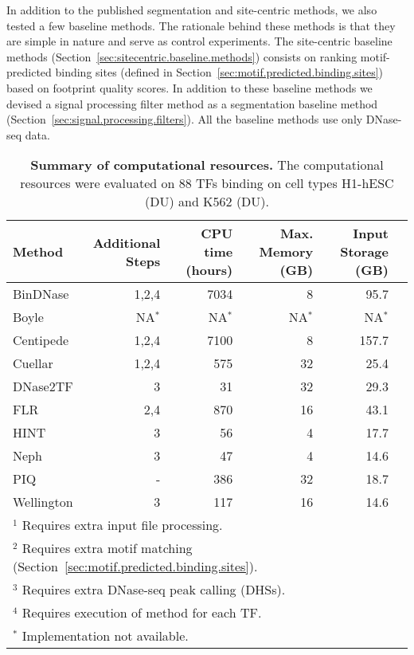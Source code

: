 In addition to the published segmentation and site-centric methods, we also tested a few baseline methods. The rationale behind these methods is that they are simple in nature and serve as control experiments. The site-centric baseline methods (Section~\ref{sec:sitecentric.baseline.methods}) consists on ranking motif-predicted binding sites (defined in Section~\ref{sec:motif.predicted.binding.sites}) based on footprint quality scores. In addition to these baseline methods we devised a signal processing filter method as a segmentation baseline method (Section~\ref{sec:signal.processing.filters}). All the baseline methods use only DNase-seq data.

\begin{table}[h]
\begin{center}
\caption[Summary of computational resources]{\textbf{Summary of computational resources.} The computational resources were evaluated on 88 TFs binding on cell types H1-hESC (DU) and K562 (DU).} 
\label{tab:comp.resource}
\renewcommand{\arraystretch}{1.2}
\begin{tabularx}{\textwidth}{ lrrrrr }
\hline
Method & Additional Steps & CPU time (hours) & Max. Memory (GB) & Input Storage (GB) \\
\hline
BinDNase & 1,2,4 & 7034 & 8 & 95.7 \\
Boyle & NA$^*$ & NA$^*$ & NA$^*$ & NA$^*$ \\
Centipede & 1,2,4 & 7100 & 8 & 157.7 \\
Cuellar & 1,2,4 & 575 & 32 & 25.4 \\
DNase2TF & 3 & 31 & 32 & 29.3 \\
FLR & 2,4 & 870 & 16 & 43.1 \\
HINT & 3 & 56 & 4 & 17.7 \\
Neph & 3 & 47 & 4 & 14.6 \\
PIQ & - & 386 & 32 & 18.7 \\
Wellington & 3 & 117 & 16 & 14.6 \\
\hline
\multicolumn{6}{l}{$^1$ Requires extra input file processing.} \\
\multicolumn{6}{l}{$^2$ Requires extra motif matching (Section~\ref{sec:motif.predicted.binding.sites}).} \\
\multicolumn{6}{l}{$^3$ Requires extra DNase-seq peak calling (DHSs).} \\
\multicolumn{6}{l}{$^4$ Requires execution of method for each TF.} \\
\multicolumn{6}{l}{$^*$ Implementation not available.} \\
\end{tabularx}
\end{center}
\end{table}

